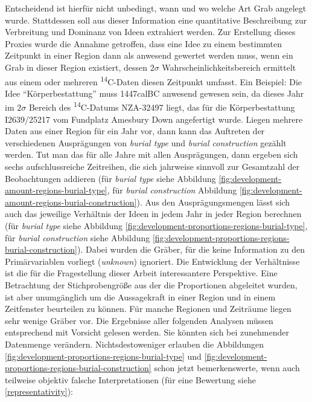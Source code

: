 \documentclass[openany,twoside,twocolumn]{book}
\begin{document}
Entscheidend ist hierfür nicht unbedingt, wann und wo welche Art Grab angelegt wurde. Stattdessen soll aus dieser Information eine quantitative Beschreibung zur Verbreitung und Dominanz von Ideen extrahiert werden. Zur Erstellung dieses Proxies wurde die Annahme getroffen, dass eine Idee zu einem bestimmten Zeitpunkt in einer Region dann als anwesend gewertet werden muss, wenn ein Grab in dieser Region existiert, dessen \(2\sigma\) Wahrscheinlichkeitsbereich ermittelt aus einem oder mehreren \textsuperscript{14}C-Daten diesen Zeitpunkt umfasst. Ein Beispiel: Die Idee ``Körperbestattung'' muss 1447calBC anwesend gewesen sein, da dieses Jahr im \(2\sigma\) Bereich des \textsuperscript{14}C-Datums NZA-32497 liegt, das für die Körperbestattung I2639/25217 vom Fundplatz Amesbury Down angefertigt wurde. Liegen mehrere Daten aus einer Region für ein Jahr vor, dann kann das Auftreten der verschiedenen Ausprägungen von \emph{burial type} und \emph{burial construction} gezählt werden. Tut man das für alle Jahre mit allen Ausprägungen, dann ergeben sich sechs aufschlussreiche Zeitreihen, die sich jahrweise sinnvoll zur Gesamtzahl der Beobachtungen addieren (für \emph{burial type} siehe Abbildung \ref{fig:development-amount-regions-burial-type}, für \emph{burial construction} Abbildung \ref{fig:development-amount-regions-burial-construction}). Aus den Ausprägungsmengen lässt sich auch das jeweilige Verhältnis der Ideen in jedem Jahr in jeder Region berechnen (für \emph{burial type} siehe Abbildung \ref{fig:development-proportions-regions-burial-type}, für \emph{burial construction} siehe Abbildung \ref{fig:development-proportions-regions-burial-construction}). Dabei wurden die Gräber, für die keine Information zu den Primärvariablen vorliegt (\emph{unknown}) ignoriert. Die Entwicklung der Verhältnisse ist die für die Fragestellung dieser Arbeit interessantere Perspektive. Eine Betrachtung der Stichprobengröße aus der die Proportionen abgeleitet wurden, ist aber unumgänglich um die Aussagekraft in einer Region und in einem Zeitfenster beurteilen zu können. Für manche Regionen und Zeiträume liegen sehr wenige Gräber vor. Die Ergebnisse aller folgenden Analysen müssen entsprechend mit Vorsicht gelesen werden. Sie könnten sich bei zunehmender Datenmenge verändern. Nichtsdestoweniger erlauben die Abbildungen \ref{fig:development-proportions-regions-burial-type} und \ref{fig:development-proportions-regions-burial-construction} schon jetzt bemerkenswerte, wenn auch teilweise objektiv falsche Interpretationen (für eine Bewertung siehe \ref{representativity}):
\end{document}
